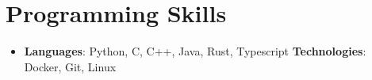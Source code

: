 \documentclass[letterpaper,11pt]{article}
\newcommand{\resumeSubHeadingListStart}{\begin{itemize}[leftmargin=*]}
\newcommand{\resumeSubHeadingListEnd}{\end{itemize}}
\begin{document}
\section{Programming Skills}
 \resumeSubHeadingListStart
   \item{
     \textbf{Languages}{: Python, C, C++, Java, Rust, Typescript}
     \hfill
     \textbf{Technologies}{: Docker, Git, Linux}
   }
 \resumeSubHeadingListEnd


\end{document}
